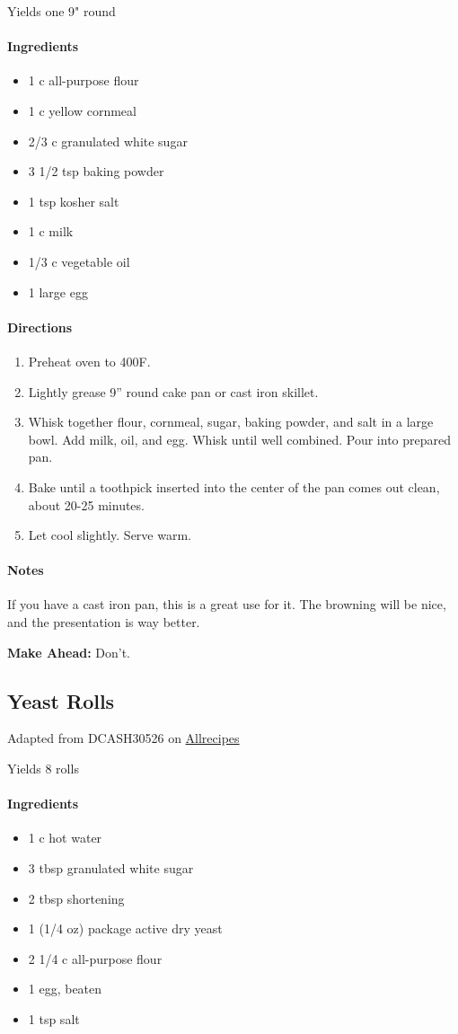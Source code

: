\documentclass[12pt]{article}
\newenvironment*{ingredients}
	{
		\paragraph*{Ingredients}
		\begin{itemize}
	}
	{
		\end{itemize}
	}
\newenvironment*{directions}
	{
		\paragraph*{Directions}
		\begin{enumerate}
	}
	{
		\end{enumerate}
	}
\newenvironment*{notes}
	{
		\paragraph*{Notes}
		\begin{adjustwidth}{1cm}{}
	}
	{
		\end{adjustwidth}
	}
\begin{document}
	Yields one 9" round
	
	\begin{ingredients}
		\item 1 c all-purpose flour
		\item 1 c yellow cornmeal
		\item 2/3 c granulated white sugar
		\item 3 1/2 tsp baking powder
		\item 1 tsp kosher salt
		\item 1 c milk
		\item 1/3 c vegetable oil
		\item 1 large egg
	\end{ingredients}
	
	\begin{directions}
		\item Preheat oven to 400F.
		\item Lightly grease 9” round cake pan or cast iron skillet.
		\item Whisk together flour, cornmeal, sugar, baking powder, and salt in a large bowl. Add milk, oil, and egg. Whisk until well combined. Pour into prepared pan.
		\item Bake until a toothpick inserted into the center of the pan comes out clean, about 20-25 minutes.
		\item Let cool slightly. Serve warm.
	\end{directions}
	
	\begin{notes}
		If you have a cast iron pan, this is a great use for it. The browning will be nice, and the presentation is way better.
		
		\textbf{Make Ahead:} Don't.
	\end{notes}
	
	\newpage
	
	\subsection{Yeast Rolls}
	Adapted from DCASH30526 on \href{https://www.allrecipes.com/recipe/13827/quick-yeast-rolls/}{Allrecipes}
	
	Yields 8 rolls
	
	\begin{ingredients}
		\item 1 c hot water
		\item 3 tbsp granulated white sugar
		\item 2 tbsp shortening
		\item 1 (1/4 oz) package active dry yeast
		\item 2 1/4 c all-purpose flour
		\item 1 egg, beaten
		\item 1 tsp salt
	\end{ingredients}
	
\end{document}
